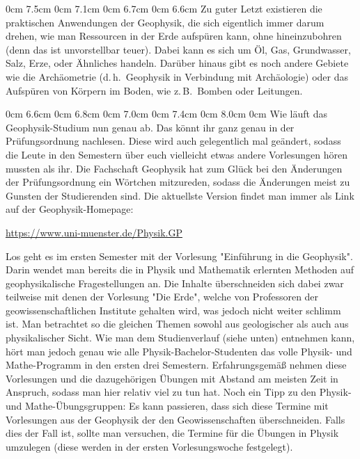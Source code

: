 \begin{multicols}{2}
{}
0cm \columnwidth
0cm \columnwidth
0cm \columnwidth
0cm \columnwidth
0cm \columnwidth
0cm \columnwidth
0cm 7.5cm
0cm 7.1cm
0cm 6.7cm
0cm 6.6cm
Zu guter Letzt existieren die praktischen Anwendungen der Geophysik, die sich eigentlich immer darum drehen, wie man Ressourcen in der Erde aufspüren kann, ohne hineinzubohren (denn das ist unvorstellbar teuer).
Dabei kann es sich um Öl, Gas, Grundwasser, Salz, Erze, oder Ähnliches handeln.
Darüber hinaus gibt es noch andere Gebiete wie die Archäometrie (d.\,h.\ Geophysik in Verbindung mit Archäologie) oder das Aufspüren von Körpern im Boden, wie z.\,B.\ Bomben oder Leitungen.

{}
0cm 6.6cm
0cm 6.8cm
0cm 7.0cm
0cm 7.4cm
0cm 8.0cm
0cm \columnwidth
0cm \columnwidth
0cm \columnwidth
0cm \columnwidth
0cm \columnwidth
0cm \columnwidth
Wie läuft das Geophysik-Studium nun genau ab.
Das könnt ihr ganz genau in der Prüfungsordnung nachlesen.
Diese wird auch gelegentlich mal geändert, sodass die Leute in den Semestern über euch vielleicht etwas andere Vorlesungen hören mussten als ihr.
Die Fachschaft Geophysik hat zum Glück bei den Änderungen der Prüfungsordnung ein Wörtchen mitzureden, sodass die Änderungen meist zu Gunsten der Studierenden sind.
Die aktuellste Version findet man immer als Link auf der Geophysik-Homepage:
\begin{center}
	\url{https://www.uni-muenster.de/Physik.GP}
\end{center}

Los geht es im ersten Semester mit der Vorlesung "Einführung in die Geophysik".
Darin wendet man bereits die in Physik und Mathematik erlernten Methoden auf geophysikalische Fragestellungen an.
Die Inhalte überschneiden sich dabei zwar teilweise mit denen der Vorlesung "Die Erde", welche von Professoren der geowissenschaftlichen Institute gehalten wird, was jedoch nicht weiter schlimm ist.
Man betrachtet so die gleichen Themen sowohl aus geologischer als auch aus physikalischer Sicht.
Wie man dem Studienverlauf (siehe unten) entnehmen kann, hört man jedoch genau wie alle Physik-Bachelor-Studenten das volle Physik- und Mathe-Programm in den ersten drei Semestern.
Erfahrungsgemäß nehmen diese Vorlesungen und die dazugehörigen Übungen mit Abstand am meisten Zeit in Anspruch, sodass man hier relativ viel zu tun hat.
Noch ein Tipp zu den Physik- und Mathe-Übungsgruppen: Es kann passieren, dass sich diese Termine mit Vorlesungen aus der Geophysik der den Geowissenschaften überschneiden.
Falls dies der Fall ist, sollte man versuchen, die Termine für die Übungen in Physik umzulegen (diese werden in der ersten Vorlesungswoche festgelegt).


\end{multicols}
